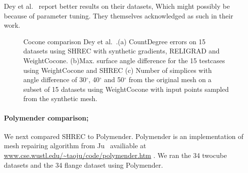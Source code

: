 Dey et al.~\cite{Dey2012,Dey2013} report better results on their datasets, Which might possibly be because of parameter tuning. They themselves acknowledged as such in their work.
\begin{figure}[htb]
	\centering
		\caption{Cocone comparison Dey et al.~\cite{Dey2012,Dey2013}.(a) CountDegree errors on 15 datasets using SHREC with synthetic gradients, RELIGRAD and WeightCocone. (b)Max. surface angle difference for the 15 testcases using WeightCocone and SHREC (c) Number of simplices with angle difference of 30$^\circ$, 40$^\circ$ and 50$^\circ$ from the original mesh on a subset of 15 datasets using WeightCocone with  input points sampled from the synthetic mesh.}
		\label{fig:cocone:compare}
\end{figure}
\paragraph{Polymender comparison;}
We next compared SHREC to Polymender. Polymender is an implementation of mesh repairing algorithm from Ju~\cite{j-rrpm-04} availiable at \url{www.cse.wustl.edu/~taoju/code/polymender.htm} \href{http://www.cse.wustl.edu/~taoju/code/polymender.htm}{}. 
We ran the 34 twocube datasets and the 34 flange dataset using Polymender. 

